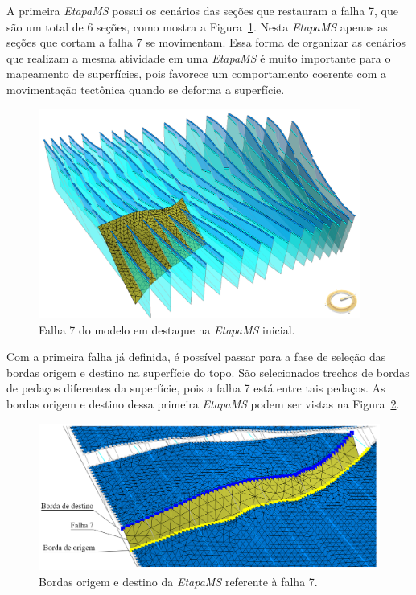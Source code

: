 A primeira \textit{EtapaMS} possui os cenários das seções que restauram a falha 7, que são um total de 6 seções, como mostra a Figura~\ref{fig-example-2-5}. Nesta \textit{EtapaMS} apenas as seções que cortam a falha 7 se movimentam. Essa forma de organizar as cenários que realizam a mesma atividade em uma \textit{EtapaMS} é muito importante para o mapeamento de superfícies, pois favorece um comportamento coerente com a movimentação tectônica quando se deforma a superfície.

\begin{figure} [H]
  \begin{center}
    \includegraphics[width=300pt]{images/fig-example-2-5}
    \caption{Falha 7 do modelo em destaque na \textit{EtapaMS} inicial.}\label{fig-example-2-5}
  \end{center}
\end{figure}

Com a primeira falha já definida, é possível passar para a fase de seleção das bordas origem e destino na superfície do topo. São selecionados trechos de bordas de pedaços diferentes da superfície, pois a falha 7 está entre tais pedaços. As bordas origem e destino dessa primeira \textit{EtapaMS} podem ser vistas na Figura~\ref{fig-example-2-6}.

\begin{figure} [H]
  \begin{center}
    \includegraphics[width=350pt]{images/fig-example-2-6}
    \caption{Bordas origem e destino da \textit{EtapaMS} referente à falha 7.}\label{fig-example-2-6}
  \end{center}
\end{figure}

